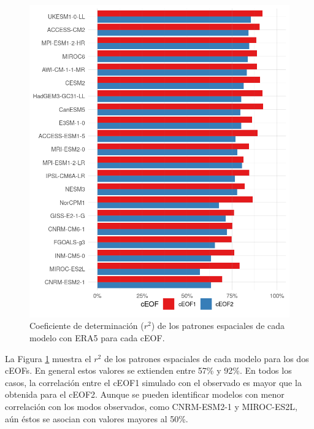 \documentclass[12pt,oneside,a4paper]{reedthesis}
\begin{document}
\begin{figure}

{\centering \includegraphics{figures/50-cmip6/comparacion-r2-1} 

}

\caption{Coeficiente de determinación (\(r^2\)) de los patrones espaciales de cada modelo con ERA5 para cada cEOF.}\label{fig:comparacion-r2}
\end{figure}

La Figura \ref{fig:comparacion-r2} muestra el \(r^2\) de los patrones espaciales de cada modelo para los dos cEOFs.
En general estos valores se extienden entre 57\% y 92\%.
En todos los casos, la correlación entre el cEOF1 simulado con el observado es mayor que la obtenida para el cEOF2.
Aunque se pueden identificar modelos con menor correlación con los modos observados, como CNRM-ESM2-1 y MIROC-ES2L, aún éstos se asocian con valores mayores al 50\%.
\end{document}
